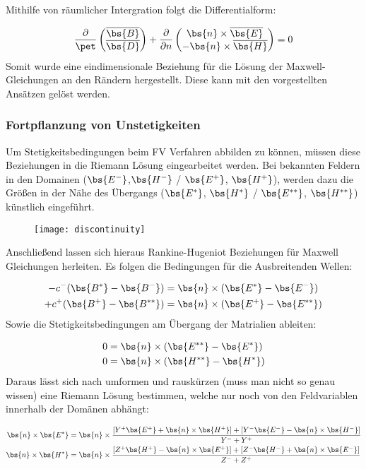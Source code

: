 Mithilfe von r\"aumlicher Intergration folgt die Differentialform:
\par
\begin{equation*}
	\frac{\partial}{\pet}\begin{pmatrix} \overline{\bs{B}} \\ \overline{\bs{D}} \end{pmatrix} + \frac{\partial}{\partial n} \begin{pmatrix} \bs{n} \times \overline{\bs{E}} \\ -\bs{n} \times \overline{\bs{H}} \end{pmatrix} = 0
\end{equation*}
Somit wurde eine eindimensionale Beziehung f\"ur die L\"osung der Maxwell-Gleichungen an den R\"andern hergestellt. Diese kann mit den vorgestellten Ans\"atzen gel\"ost werden.

\subsubsection{Fortpflanzung von Unstetigkeiten}
Um Stetigkeitsbedingungen beim FV Verfahren abbilden zu k\"onnen, m\"ussen diese Beziehungen in die Riemann L\"osung eingearbeitet werden. Bei bekannten Feldern in den Domainen ($\bs{E^-}$,$\bs{H^-}$ / $\bs{E^+}$, $\bs{H^+}$), werden dazu die Gr\"o\ss{}en in der N\"ahe des \"Ubergangs ($\bs{E^*}$, $\bs{H^*}$ / $\bs{E^{**}}$, $\bs{H^{**}}$) k\"unstlich eingef\"uhrt.
\par
\begin{figure}[ht]
	\centering
	\texttt{[image: discontinuity]}
\end{figure}
Anschlie\ss{}end lassen sich hieraus Rankine-Hugeniot Beziehungen f\"ur Maxwell Gleichungen herleiten. Es folgen die Bedingungen f\"ur die Ausbreitenden Wellen:
\par
\begin{align*}
	-c^-(\bs{B^*} - \bs{B^-}) &= \bs{n}\times(\bs{E^*} - \bs{E^-}) \\
	+c^+(\bs{B^+} - \bs{B^{**}}) &= \bs{n}\times(\bs{E^+} - \bs{E^{**}})
\end{align*}
Sowie die Stetigkeitsbedingungen am \"Ubergang der Matrialien ableiten:
\par
\begin{align*}
	0 &= \bs{n}\times(\bs{E^{**}} - \bs{E^*}) \\
	0 &= \bs{n}\times(\bs{H^{**}} - \bs{H^*})
\end{align*}
Daraus l\"asst sich nach umformen und rausk\"urzen (muss man nicht so genau wissen) eine Riemann L\"osung bestimmen, welche nur noch von den Feldvariablen innerhalb der Dom\"anen abh\"angt:
\par
\begin{align*}
	\bs{n}\times\bs{E^*} &= \bs{n}\times\frac{[Y^+\bs{E^+} + \bs{n}\times\bs{H^+}] + [Y^-\bs{E^-} - \bs{n}\times\bs{H^-}]}{Y^- + Y^+} \\
	\bs{n}\times\bs{H^*} &= \bs{n}\times\frac{[Z^+\bs{H^+} - \bs{n}\times\bs{E^+}] + [Z^-\bs{H^-} + \bs{n}\times\bs{E^-}]}{Z^- + Z^+}
\end{align*}

